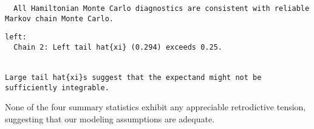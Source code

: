\documentclass[
  letterpaper,
  DIV=11,
  numbers=noendperiod]{scrartcl}
\newenvironment{Shaded}{\begin{snugshade}}{\end{snugshade}}
\newcommand{\FunctionTok}[1]{\textcolor[rgb]{0.28,0.35,0.67}{#1}}
\newcommand{\NormalTok}[1]{\textcolor[rgb]{0.00,0.23,0.31}{#1}}
\newcommand{\OtherTok}[1]{\textcolor[rgb]{0.00,0.23,0.31}{#1}}
\newcommand{\SpecialCharTok}[1]{\textcolor[rgb]{0.37,0.37,0.37}{#1}}
\newcommand{\StringTok}[1]{\textcolor[rgb]{0.13,0.47,0.30}{#1}}
\begin{document}
\begin{verbatim}
  All Hamiltonian Monte Carlo diagnostics are consistent with reliable
Markov chain Monte Carlo.
\end{verbatim}

\begin{Shaded}
\end{Shaded}

\begin{verbatim}
left:
  Chain 2: Left tail hat{xi} (0.294) exceeds 0.25.


Large tail hat{xi}s suggest that the expectand might not be
sufficiently integrable.
\end{verbatim}

None of the four summary statistics exhibit any appreciable retrodictive
tension, suggesting that our modeling assumptions are adequate.
\end{document}
